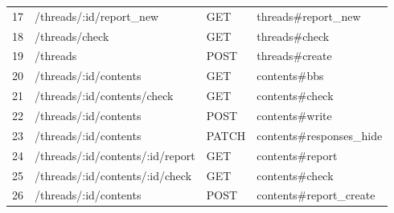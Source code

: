 \documentclass[a4j]{jarticle}
\begin{document}
\begin{table}[htb]
\begin{tabular}{|l|l|l||l|}
	17&/threads/:id/report\_new   		&   GET      &threads\#report\_new  \\
	18&	/threads/check               		&   GET      & threads\#check       \\
	19&	/threads                      		 & POST     & threads\#create     \\
	20&	/threads/:id/contents      		 &    GET    & contents\#bbs        \\
	21&	/threads/:id/contents/check 	&     GET    &  contents\#check   \\
	22&	/threads/:id/contents          	 &    POST  & contents\#write     \\
	23&	/threads/:id/contents          	 &    PATCH  & contents\#responses\_hide     \\
	24&	/threads/:id/contents/:id/report	 &    GET    & contents\#report    \\
	25&	/threads/:id/contents/:id/check   &   GET    &  contents\#check      \\
	26&	/threads/:id/contents            	 &   POST   & contents\#report\_create \\ \hline

\end{tabular}

\end{table}
\end{document}
